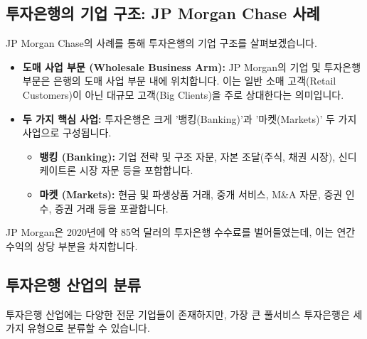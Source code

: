 \documentclass[11pt,a4paper]{book}
\theoremstyle{definition}
\begin{document}
\subsection{투자은행의 기업 구조: JP Morgan Chase 사례}
JP Morgan Chase의 사례를 통해 투자은행의 기업 구조를 살펴보겠습니다.
\begin{itemize}
    \item \textbf{도매 사업 부문 (Wholesale Business Arm):} JP Morgan의 기업 및 투자은행 부문은 은행의 도매 사업 부문 내에 위치합니다. 이는 일반 소매 고객(Retail Customers)이 아닌 대규모 고객(Big Clients)을 주로 상대한다는 의미입니다.
    \item \textbf{두 가지 핵심 사업:} 투자은행은 크게 '뱅킹(Banking)'과 '마켓(Markets)' 두 가지 사업으로 구성됩니다.
    \begin{itemize}
        \item \textbf{뱅킹 (Banking):} 기업 전략 및 구조 자문, 자본 조달(주식, 채권 시장), 신디케이트론 시장 자문 등을 포함합니다.
        \item \textbf{마켓 (Markets):} 현금 및 파생상품 거래, 중개 서비스, M\&A 자문, 증권 인수, 증권 거래 등을 포괄합니다.
    \end{itemize}
\end{itemize}
JP Morgan은 2020년에 약 85억 달러의 투자은행 수수료를 벌어들였는데, 이는 연간 수익의 상당 부분을 차지합니다.

\subsection{투자은행 산업의 분류}
투자은행 산업에는 다양한 전문 기업들이 존재하지만, 가장 큰 풀서비스 투자은행은 세 가지 유형으로 분류할 수 있습니다.
\end{document}
